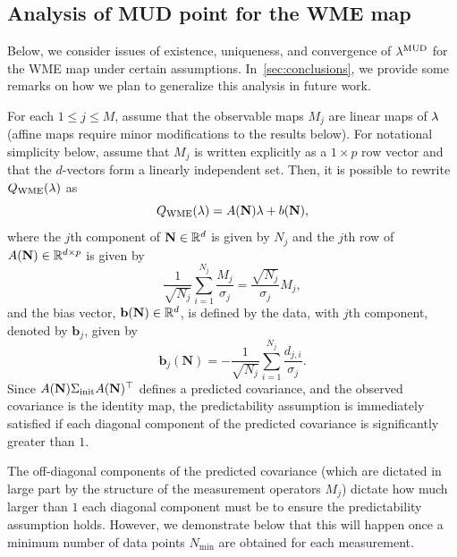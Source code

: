 \subsection{Analysis of MUD point for the WME map}\label{sec:MUD_analysis}

Below, we consider issues of existence, uniqueness, and convergence of $\lambda^{\text{MUD}}$ for the WME map under certain assumptions.
In~\ref{sec:conclusions}, we provide some remarks on how we plan to generalize this analysis in future work.


For each $1\leq j\leq M$, assume that the observable maps $M_j$ are linear maps of $\lambda$ (affine maps require minor modifications to the results below).
For notational simplicity below, assume that $M_j$ is written explicitly as a $1\times p$ row vector and that the $d$-vectors form a linearly independent set.
Then, it is possible to rewrite $Q_{\text{WME}}(\lambda)$ as
\begin{equation}
	Q_\text{WME}(\lambda) = A(\mathbf{N})\lambda + b(\mathbf{N}),
\end{equation}
where the $j$th component of $\mathbf{N}\in\mathbb{R}^d$ is given by $N_j$ and the $j$th row of $A(\mathbf{N})\in\mathbb{R}^{d\times p}$ is given by
\begin{equation}
	\frac{1}{\sqrt{N_j}} \sum_{i=1}^{N_j} \frac{M_j}{\sigma_j} = \frac{\sqrt{N_j}}{\sigma_j}M_j,
\end{equation}
and the bias vector, $\mathbf{b}(\mathbf{N})\in\mathbb{R}^d$, is defined by the data, with $j$th component, denoted by $\mathbf{b}_j$, given by
\begin{equation}
	\mathbf{b}_j(\mathbf{N}) = -\frac{1}{\sqrt{N_j}} \sum_{i=1}^{N_j} \frac{d_{j,i}}{\sigma_j}.
\end{equation}
Since $A(\mathbf{N})\Sigma_\text{init} A(\mathbf{N})^\top$ defines a predicted covariance, and the observed covariance is the identity map, the predictability assumption is immediately satisfied if each diagonal component of the predicted covariance is significantly greater than $1$.

The off-diagonal components of the predicted covariance (which are dictated in large part by the structure of the measurement operators $M_j$) dictate how much larger than $1$ each diagonal component must be to ensure the predictability assumption holds.
However, we demonstrate below that this will happen once a minimum number of data points $N_\text{min}$ are obtained for each measurement.

